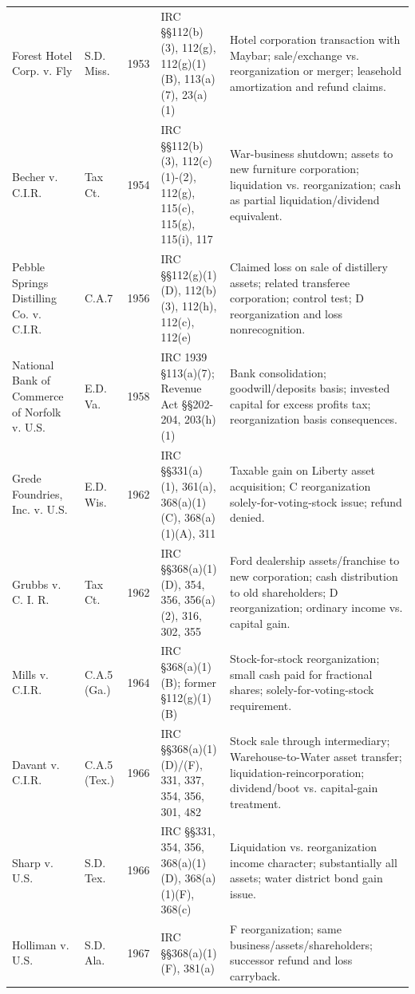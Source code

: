 \begin{footnotesize}
\begin{longtable}{p{}p{}p{}p{}p{}}
Forest Hotel Corp. v. Fly & S.D. Miss. & 1953 & IRC \S\S 112(b)(3), 112(g), 112(g)(1)(B), 113(a)(7), 23(a)(1) & Hotel corporation transaction with Maybar; sale/exchange vs. reorganization or merger; leasehold amortization and refund claims. \\
Becher v. C.I.R. & Tax Ct. & 1954 & IRC \S\S 112(b)(3), 112(c)(1)-(2), 112(g), 115(c), 115(g), 115(i), 117 & War-business shutdown; assets to new furniture corporation; liquidation vs. reorganization; cash as partial liquidation/dividend equivalent. \\
Pebble Springs Distilling Co. v. C.I.R. & C.A.7 & 1956 & IRC \S\S 112(g)(1)(D), 112(b)(3), 112(h), 112(c), 112(e) & Claimed loss on sale of distillery assets; related transferee corporation; control test; D reorganization and loss nonrecognition. \\
National Bank of Commerce of Norfolk v. U.S. & E.D. Va. & 1958 & IRC 1939 \S 113(a)(7); Revenue Act \S\S 202-204, 203(h)(1) & Bank consolidation; goodwill/deposits basis; invested capital for excess profits tax; reorganization basis consequences. \\
Grede Foundries, Inc. v. U.S. & E.D. Wis. & 1962 & IRC \S\S 331(a)(1), 361(a), 368(a)(1)(C), 368(a)(1)(A), 311 & Taxable gain on Liberty asset acquisition; C reorganization solely-for-voting-stock issue; refund denied. \\
Grubbs v. C. I. R. & Tax Ct. & 1962 & IRC \S\S 368(a)(1)(D), 354, 356, 356(a)(2), 316, 302, 355 & Ford dealership assets/franchise to new corporation; cash distribution to old shareholders; D reorganization; ordinary income vs. capital gain. \\
Mills v. C.I.R. & C.A.5 (Ga.) & 1964 & IRC \S 368(a)(1)(B); former \S 112(g)(1)(B) & Stock-for-stock reorganization; small cash paid for fractional shares; solely-for-voting-stock requirement. \\
Davant v. C.I.R. & C.A.5 (Tex.) & 1966 & IRC \S\S 368(a)(1)(D)/(F), 331, 337, 354, 356, 301, 482 & Stock sale through intermediary; Warehouse-to-Water asset transfer; liquidation-reincorporation; dividend/boot vs. capital-gain treatment. \\
Sharp v. U.S. & S.D. Tex. & 1966 & IRC \S\S 331, 354, 356, 368(a)(1)(D), 368(a)(1)(F), 368(c) & Liquidation vs. reorganization income character; substantially all assets; water district bond gain issue. \\
Holliman v. U.S. & S.D. Ala. & 1967 & IRC \S\S 368(a)(1)(F), 381(a) & F reorganization; same business/assets/shareholders; successor refund and loss carryback. \\

\end{longtable}
\end{footnotesize}
